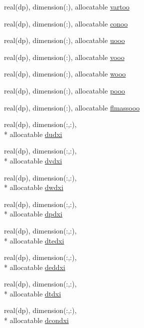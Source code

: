 \begin{DoxyCompactItemize}
real(dp), dimension(\-:), allocatable \hyperlink{classvariables_ad3200e0111fea315c6ab22914a587b73}{vartoo}
\item 
real(dp), dimension(\-:), allocatable \hyperlink{classvariables_a603b0ba2a9c45abdf2b52280e6079624}{conoo}
\item 
real(dp), dimension(\-:), allocatable \hyperlink{classvariables_a0adf9388c035f1dd87cb6bad262eec1e}{uooo}
\item 
real(dp), dimension(\-:), allocatable \hyperlink{classvariables_ae37a5baff84f1f71a83c36e78d81a137}{vooo}
\item 
real(dp), dimension(\-:), allocatable \hyperlink{classvariables_aebc14f0f9203bb1e65503d86138e709f}{wooo}
\item 
real(dp), dimension(\-:), allocatable \hyperlink{classvariables_a5150120fa0257c929b9f53ba329697d8}{pooo}
\item 
real(dp), dimension(\-:), allocatable \hyperlink{classvariables_aa647a7a6f42f6b652dcf8c2e61e520cb}{flmassooo}
\item 
real(dp), dimension(\-:,\-:), \\*
allocatable \hyperlink{classvariables_adf961b8b4d768b0af149ab314d3fa105}{dudxi}
\item 
real(dp), dimension(\-:,\-:), \\*
allocatable \hyperlink{classvariables_a1a0e5852e192a2d1781836fcc07ea35d}{dvdxi}
\item 
real(dp), dimension(\-:,\-:), \\*
allocatable \hyperlink{classvariables_a1235eb8caf98213f84ecb70e9c75b21f}{dwdxi}
\item 
real(dp), dimension(\-:,\-:), \\*
allocatable \hyperlink{classvariables_af1f54c1cc3dfd9f13d85a48b5e283814}{dpdxi}
\item 
real(dp), dimension(\-:,\-:), \\*
allocatable \hyperlink{classvariables_abe283c990e397f1ab1bd22b2c34c4458}{dtedxi}
\item 
real(dp), dimension(\-:,\-:), \\*
allocatable \hyperlink{classvariables_ae24355786c27f5a676febe36335e0718}{deddxi}
\item 
real(dp), dimension(\-:,\-:), \\*
allocatable \hyperlink{classvariables_ae5589138d3a0b0d28a2bb0ad9fb3e26e}{dtdxi}
\item 
real(dp), dimension(\-:,\-:), \\*
allocatable \hyperlink{classvariables_a816ecf2312ba34dbdb000202938da807}{dcondxi}

\end{DoxyCompactItemize}
